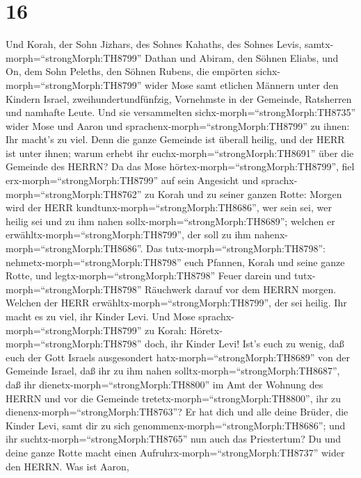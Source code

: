 \hypertarget{section-15}{%
\section{16}\label{section-15}}

 Und Korah, der Sohn Jizhars, des Sohnes Kahaths, des Sohnes
Levis, samtx-morph=``strongMorph:TH8799'' Dathan und Abiram, den Söhnen
Eliabs, und On, dem Sohn Peleths, den Söhnen Rubens,  die
empörten sichx-morph=``strongMorph:TH8799'' wider Mose samt etlichen
Männern unter den Kindern Israel, zweihundertundfünfzig, Vornehmste in
der Gemeinde, Ratsherren und namhafte Leute.  Und sie
versammelten sichx-morph=``strongMorph:TH8735'' wider Mose und Aaron und
sprachenx-morph=``strongMorph:TH8799'' zu ihnen: Ihr macht's zu viel.
Denn die ganze Gemeinde ist überall heilig, und der HERR ist unter
ihnen; warum erhebt ihr euchx-morph=``strongMorph:TH8691'' über die
Gemeinde des HERRN?  Da das Mose
hörtex-morph=``strongMorph:TH8799'', fiel
erx-morph=``strongMorph:TH8799'' auf sein Angesicht  und
sprachx-morph=``strongMorph:TH8762'' zu Korah und zu seiner ganzen
Rotte: Morgen wird der HERR kundtunx-morph=``strongMorph:TH8686'', wer
sein sei, wer heilig sei und zu ihm nahen
sollx-morph=``strongMorph:TH8689''; welchen er
erwähltx-morph=``strongMorph:TH8799'', der soll zu ihm
nahenx-morph=``strongMorph:TH8686''.  Das
tutx-morph=``strongMorph:TH8798'': nehmetx-morph=``strongMorph:TH8798''
euch Pfannen, Korah und seine ganze Rotte,  und
legtx-morph=``strongMorph:TH8798'' Feuer darein und
tutx-morph=``strongMorph:TH8798'' Räuchwerk darauf vor dem HERRN morgen.
Welchen der HERR erwähltx-morph=``strongMorph:TH8799'', der sei heilig.
Ihr macht es zu viel, ihr Kinder Levi.  Und Mose
sprachx-morph=``strongMorph:TH8799'' zu Korah:
Höretx-morph=``strongMorph:TH8798'' doch, ihr Kinder Levi! 
Ist's euch zu wenig, daß euch der Gott Israels ausgesondert
hatx-morph=``strongMorph:TH8689'' von der Gemeinde Israel, daß ihr zu
ihm nahen solltx-morph=``strongMorph:TH8687'', daß ihr
dienetx-morph=``strongMorph:TH8800'' im Amt der Wohnung des HERRN und
vor die Gemeinde tretetx-morph=``strongMorph:TH8800'', ihr zu
dienenx-morph=``strongMorph:TH8763''?  Er hat dich und alle
deine Brüder, die Kinder Levi, samt dir zu sich
genommenx-morph=``strongMorph:TH8686''; und ihr
suchtx-morph=``strongMorph:TH8765'' nun auch das Priestertum?
 Du und deine ganze Rotte macht einen
Aufruhrx-morph=``strongMorph:TH8737'' wider den HERRN. Was ist Aaron,
